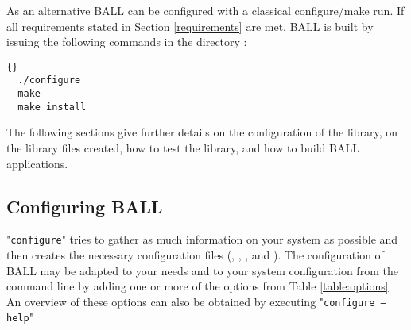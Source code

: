 As an alternative BALL can be configured with a classical configure/make
run. If all requirements stated in Section \ref{requirements} are met, BALL is
built by issuing the following commands in the directory 
:

\begin{lstlisting}{}
  ./configure
  make
  make install
\end{lstlisting}

The following sections give further details on the configuration of the 
library, on the library files created, how to test the library, and how to 
build BALL applications.

\subsection{Configuring BALL}

"{\tt configure}" tries to gather as much information on your system as 
possible and then creates the necessary configuration files (,
, , and ).
The configuration of BALL may be adapted to your needs and to your system
configuration from the command line by adding one or more of the options from
Table \ref{table:options}.
An overview of these options can also be obtained by executing "{\tt configure
--help}"

